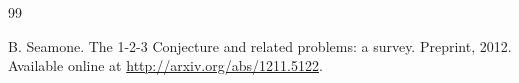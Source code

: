 \documentclass[a4paper,11pt,dvipsnames]{elsarticle}
\begin{document}
\begin{thebibliography}{99}











 B. Seamone. The 1-2-3 Conjecture and related problems: a survey. Preprint, 2012. Available online at \url{http://arxiv.org/abs/1211.5122}.





\end{thebibliography}
\end{document}
